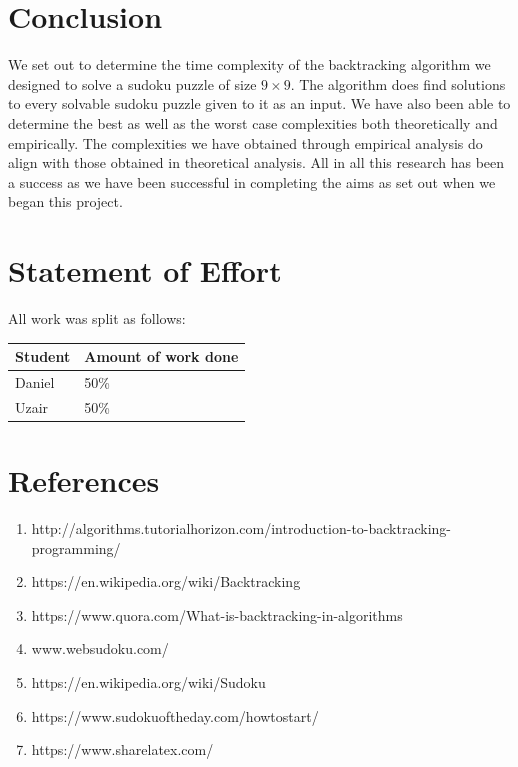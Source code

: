 \documentclass[12pt,a4paper,titlepage]{article}
\begin{document}
\newpage
\section{Conclusion}

We set out to determine the time complexity of the backtracking algorithm we designed to solve a sudoku puzzle of size $ 9 \times 9$. The algorithm does find solutions to every solvable sudoku puzzle given to it as an input. We have also been able to determine the best as well as the worst case complexities both theoretically and empirically. The complexities we have obtained through empirical analysis do align with those obtained in theoretical analysis. All in all this research has been a success as we have been successful in completing the aims as set out when we began this project.

\section{Statement of Effort}

All work was split as follows:
\\

\begin{tabularx}{\linewidth}{| X | X |}
\hline
\textbf{Student} & \textbf{Amount of work done}\\
\hline
Daniel & 50\% \\
\hline
Uzair & 50\% \\
\hline
\end{tabularx}

\section{References}

\begin{enumerate}
\item http://algorithms.tutorialhorizon.com/introduction-to-backtracking-programming/
\item https://en.wikipedia.org/wiki/Backtracking
\item https://www.quora.com/What-is-backtracking-in-algorithms
\item www.websudoku.com/
\item https://en.wikipedia.org/wiki/Sudoku
\item https://www.sudokuoftheday.com/howtostart/
\item https://www.sharelatex.com/
\end{enumerate}
\end{document}

